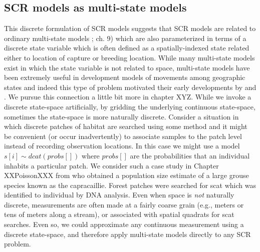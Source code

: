 \subsection{SCR models as multi-state models}
This discrete formulation of SCR models suggests that SCR models are
related to ordinary multi-state models \citep{kery_schaub:2011};
ch. 9) which are also parameterized in terms of a discrete state
variable which is often defined as a spatially-indexed state related
either to location of capture or breeding location. While many
multi-state models exist in which the state variable is not related to
space, multi-state models have been extremely useful in development
models of movements among geographic states and indeed this type of
problem motivated their early developments by \citet{arnason:1973,
  arnason:1974} and \citet{hestbeck_etal:1991}.  We pursue this connection a little bit more in chapter XYZ. 
While we invoke a discrete state-space artificially, by gridding the
underlying continuous state-space, sometimes the state-space is more
naturally discrete. Consider a situation in which discrete patches of
habitat are searched using some method and it might be convenient (or
occur inadvertently) to associate samples to the patch level instead
of recording observation locations. In this case we might use a model
$s[i] \sim dcat(probs[])$  where $probs[]$ are the probabilities that
an individual inhabits a particular patch. We consider such a case
study in Chapter XXPoissonXXX from \citet{mollet_etal:2012} who
obtained a population size estimate of a large grouse species known as
the capracaillie. Forest patches were searched for scat which was
identified to individual by DNA analysis. Even when space is {\it not}
naturally discrete, measurements are often made at a fairly coarse
grain (e.g., meters or tens of meters along a stream), or associated
with spatial quadrats for scat searches. Even so, we could approximate
any continuous measurement using a discrete state-space, and therefore
apply multi-state models directly to any SCR problem. 


